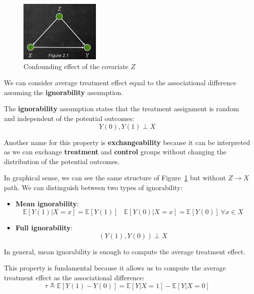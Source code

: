\begin{figure}[!ht]
    \centering
    \includegraphics[width=0.35\textwidth]{img/potential_outcomes/confounding.png}
    \caption{Confounding effect of the covariate $Z$}
    \label{fig:confounding}
\end{figure}

We can consider average treatment effect equal to the associational difference
assuming the \textbf{ignorability} assumption.
\begin{definition}
    The \textbf{ignorability} assumption states that the treatment assignment
    is random and independent of the potential outcomes:
    \begin{equation}
        Y(0), Y(1) \perp X
    \end{equation}
\end{definition}

Another name for this property is \textbf{exchangeability} because it can be
interpreted as we can exchange \textbf{treatment} and \textbf{control} groups without changing the
distribution of the potential outcomes.

In graphical sense, we can see the same structure of Figure~\ref{fig:confounding}
but without $Z \to X$ path. We can distinguish between two types of ignorability:
\begin{itemize}
    \item \textbf{Mean ignorability}:
          \begin{equation*}
              \mathbb{E}[Y(1)|X = x]  =  \mathbb{E}[Y(1)]\ \ \ \
              \mathbb{E}[Y(0)|X = x]  =  \mathbb{E}[Y(0)] \ \forall x \in X
          \end{equation*}
    \item \textbf{Full ignorability}:
          \begin{equation*}
              (Y(1), Y(0))\perp X
          \end{equation*}
\end{itemize}
In general, mean ignorability is enough to compute the average treatment effect.

This property is fundamental because it allows us to compute the average treatment
effect as the associational difference:
\begin{equation*}
    \tau \triangleq \mathbb{E}[Y(1) - Y(0)] = \mathbb{E}[Y|X = 1] - \mathbb{E}[Y|X = 0]
\end{equation*}

